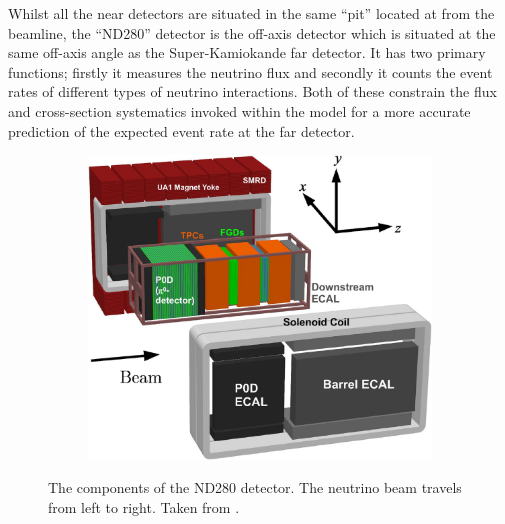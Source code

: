 Whilst all the near detectors are situated in the same ``pit'' located at  from the beamline, the ``ND280'' detector is the off-axis detector which is situated at the same off-axis angle as the Super-Kamiokande far detector. It has two primary functions; firstly it measures the neutrino flux and secondly it counts the event rates of different types of neutrino interactions. Both of these constrain the flux and cross-section systematics invoked within the model for a more accurate prediction of the expected event rate at the far detector.

\begin{figure}[h]
  \begin{subfigure}[t]{0.7\textwidth}
    \includegraphics[width=\textwidth, trim={0mm 0mm 0mm 0mm}, clip,page=1]{Figures/Detectors/T2KND280.pdf}
  \end{subfigure}
  \caption{The components of the ND280 detector. The neutrino beam travels from left to right. Taken from \cite{t2k_det}.}
  \label{fig:T2KSKExp_T2K_ND280}
\end{figure}

